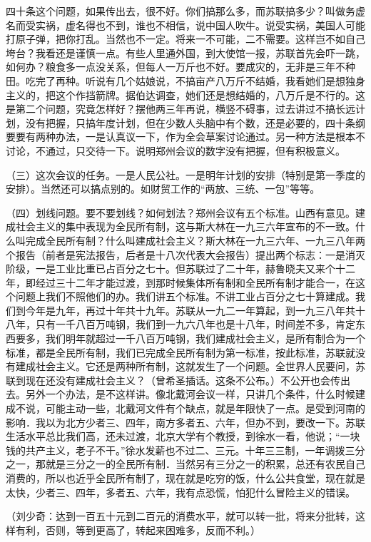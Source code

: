 四十条这个问题，如果传出去，很不好。你们搞那么多，而苏联搞多少？叫做务虚名而受实祸，虚名得也不到，谁也不相信，说中国人吹牛。说受实祸，美国人可能打原子弹，把你打乱。当然也不一定。将来一不可能，二不需要。这样岂不如自己垮台？我看还是谨慎一点。有些人里通外国，到大使馆一报，苏联首先会吓一跳，如何办？粮食多一点没关系，但每人一万斤也不好。要成灾的，无非是三年不种田。吃完了再种。听说有几个姑娘说，不搞亩产八万斤不结婚，我看她们是想独身主义的，把这个作挡箭牌。据伯达调查，她们还是想结婚的，八万斤是不行的。这是第二个问题，究竟怎样好？摆他两三年再说，横竖不碍事，过去讲过不搞长远计划，没有把握，只搞年度计划，但在少数人头脑中有个数，还是必要的，四十条纲要要有两种办法，一是认真议一下，作为全会草案讨论通过。另一种方法是根本不讨论，不通过，只交待一下。说明郑州会议的数字没有把握，但有积极意义。

（三）这次会议的任务。一是人民公社。一是明年计划的安排（特别是第一季度的安排）。当然还可以搞点别的。如财贸工作的“两放、三统、一包”等等。

（四）划线问题。要不要划线？如何划法？郑州会议有五个标准。山西有意见。建成社会主义的集中表现为全民所有制，这与斯大林在一九三六年宣布的不一致。什么叫完成全民所有制？什么叫建成社会主义？斯大林在一九三六年、一九三八年两个报告（前者是宪法报告，后者是十八次代表大会报告）提出两个标志：一是消灭阶级，一是工业比重已占百分之七十。但苏联过了二十年，赫鲁晓夫又来个十二年，即经过三十二年才能过渡，到那时候集体所有制和全民所有制才能合一，在这个问题上我们不照他们的办。我们讲五个标准。不讲工业占百分之七十算建成。我们到今年是九年，再过十年共十九年。苏联从一九二一年算起，到一九三八年共十八年，只有一千八百万吨钢，我们到一九六八年也是十八年，时间差不多，肯定东西要多，我们明年就超过一千八百万吨钢，我们建成社会主义，是所有制合为一个标准，都是全民所有制，我们已完成全民所有制为第一标准，按此标准，苏联就没有建成社会主义。它还是两种所有制，这就发生了一个问题。全世界人民要问，苏联到现在还没有建成社会主义？（曾希圣插话。这条不公布。）不公开也会传出去。另外一个办法，是不这样讲。像北戴河会议一样，只讲几个条件，什么时候建成不说，可能主动一些，北戴河文件有个缺点，就是年限快了一点。是受到河南的影响．我以为北方少者三、四年，南方多者五、六年，但办不到，要改一下。苏联生活水平总比我们高，还未过渡，北京大学有个教授，到徐水一看，他说；“一块钱的共产主义，老子不干。”徐水发薪也不过二、三元。十年三三制，一年调拨三分之一，那就是三分之一的全民所有制．当然另有三分之一的积累，总还有农民自己消费的，所以也近乎全民所有制了，现在就是吃穷的饭，什么公共食堂，现在就是太快，少者三、四年，多者五、六年，我有点恐慌，怕犯什么冒险主义的错误。

（刘少奇：达到一百五十元到二百元的消费水平，就可以转一批，将来分批转，这样有利，否则，等到更高了，转起来困难多，反而不利。）

